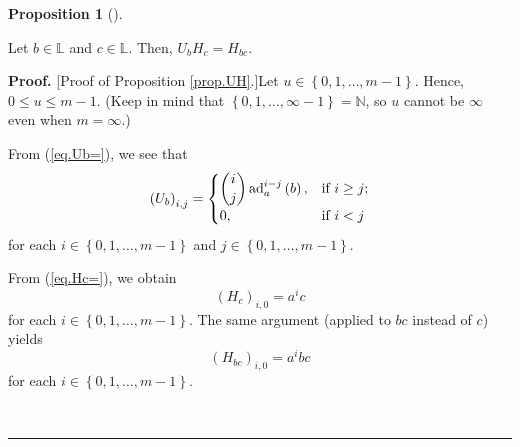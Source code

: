 \documentclass[numbers=enddot,12pt,final,onecolumn,notitlepage]{scrartcl}%
\theoremstyle{definition}
\newtheorem{prop}[theo]{Proposition}
\newenvironment{proposition}[1][]
{\begin{prop}[#1]\begin{leftbar}}
{\end{leftbar}\end{prop}}
\newenvironment{proof}[1][Proof]{\noindent\textbf{#1.} }{\ \rule{0.5em}{0.5em}}
\begin{document}
\begin{proposition}
\label{prop.UH}Let $b\in\mathbb{L}$ and $c\in\mathbb{L}$. Then, $U_{b}%
H_{c}=H_{bc}$.
\end{proposition}

\begin{proof}
[Proof of Proposition \ref{prop.UH}.]Let $u\in\left\{  0,1,\ldots,m-1\right\}
$. Hence, $0\leq u\leq m-1$. (Keep in mind that $\left\{  0,1,\ldots
,\infty-1\right\}  =\mathbb{N}$, so $u$ cannot be $\infty$ even when
$m=\infty$.)

From (\ref{eq.Ub=}), we see that%
\begin{equation}
\left(  U_{b}\right)  _{i,j}=%
\begin{cases}
\dbinom{i}{j}\operatorname*{ad}\nolimits_{a}^{i-j}\left(  b\right)  , &
\text{if }i\geq j;\\
0, & \text{if }i<j
\end{cases}
\label{pf.prop.UH.Ubij=}%
\end{equation}
for each $i\in\left\{  0,1,\ldots,m-1\right\}  $ and $j\in\left\{
0,1,\ldots,m-1\right\}  $.

From (\ref{eq.Hc=}), we obtain%
\begin{equation}
\left(  H_{c}\right)  _{i,0}=a^{i}c \label{pf.prop.UH.Hci=}%
\end{equation}
for each $i\in\left\{  0,1,\ldots,m-1\right\}  $. The same argument (applied
to $bc$ instead of $c$) yields%
\begin{equation}
\left(  H_{bc}\right)  _{i,0}=a^{i}bc \label{pf.prop.UH.Hbci=}%
\end{equation}
for each $i\in\left\{  0,1,\ldots,m-1\right\}  $.


\end{proof}
\end{document}
